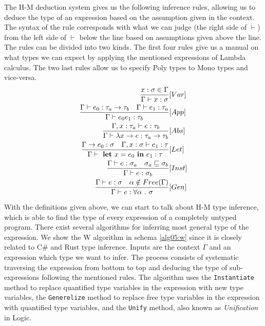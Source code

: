 The H-M deduction system gives us the following inference rules, allowing us to deduce the type of an expression based on the assumption given in the context. 
The syntax of the rule corresponds with what we can judge (the right side of $\vdash$) from the left side of $\vdash$ below the line based on assumptions given above the line.
The rules can be divided into two kinds.
The first four rules give us a manual on what types we can expect by applying the mentioned expressions of Lambda calculus. 
The two last rules allow us to specify Poly types to Mono types and vice-versa.
\begin{align*}
\frac{x : \sigma \in \Gamma}{\Gamma \vdash x : \sigma}&[Var]\\
\frac{\Gamma \vdash e_0 : \tau_a \rightarrow \tau_b\ \ \ \Gamma \vdash e_1 : \tau_a}{\Gamma \vdash e_0 e_1 : \tau_b}&[App]\\
\frac{\Gamma, x : \tau_a \vdash e : \tau_b}{\Gamma \vdash \lambda x \rightarrow e : \tau_a \rightarrow \tau_b}&[Abs]\\
\frac{\Gamma \rightarrow e_0 : \sigma \ \ \ \Gamma , x : \sigma \vdash e_1 : \tau}{\Gamma \vdash\ \text{\textbf{let}}\ x = e_0\ \text{\textbf{in}}\ e_1 : \tau}&[Let]\\
\frac{\Gamma \vdash e : \sigma_a \ \ \ \sigma_a \sqsubseteq \sigma_b}{\Gamma \vdash e : \sigma_b}&[Inst]\\
\frac{\Gamma \vdash e : \sigma \ \ \ \alpha \notin Free(\Gamma)}{\Gamma \vdash e : \forall \alpha\ .\ \sigma}&[Gen]\\
\end{align*}
\par
{}
With the definitions given above, we can start to talk about H-M type inference, which is able to find the type of every expression of a completely untyped program.
There exist several algorithms for inferring most general type of the expression.
We show the W algorithm in schema \ref{alg05:w} since it is closely related to C\# and Rust type inference.
Inputs are the context $\Gamma$ and an expression which type we want to infer.
The process consists of systematic traversing the expression from bottom to top and deducing the type of sub-expressions following the mentioned rules.
The algorithm uses the \texttt{Instantiate} method to replace quantified type variables in the expression with new type variables, the \texttt{Generelize} method to replace free type variables in the expression with quantified type variables, and the \texttt{Unify} method, also known as \textit{Unification} in Logic.
